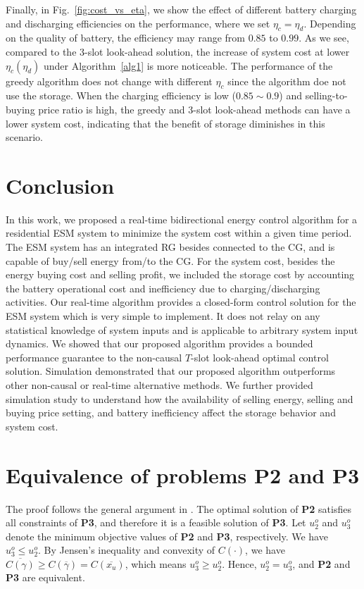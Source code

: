 \documentclass[journal]{IEEEtran}
\begin{document}
Finally, in Fig.~\ref{fig:cost_vs_eta}, we show the effect of different battery charging and discharging efficiencies on the performance, where we set $\eta_c=\eta_d$. Depending on the quality of battery, the efficiency may range from $0.85$ to $0.99$. As we see, compared to the 3-slot look-ahead solution, the increase of system cost  at lower $\eta_c(\eta_d)$ under Algorithm~\ref{alg1} is more noticeable. The performance of the greedy algorithm does not change with different $\eta_c$ since the algorithm doe not use the storage. When the charging efficiency is low ($0.85\sim0.9$) and  selling-to-buying price ratio is high, the greedy and 3-slot look-ahead methods can have a lower system cost, indicating that the benefit of storage diminishes in this scenario.


\section{Conclusion}\label{sec:conclusion}
In this work, we proposed a real-time bidirectional energy control algorithm for a residential ESM system to minimize the system cost within  a given time period. The ESM system has an integrated RG besides connected to the CG, and is capable of buy/sell energy from/to the CG. For the system cost, besides the energy buying cost and selling profit, we included the storage cost by accounting the battery operational cost and inefficiency due to charging/discharging activities. Our real-time algorithm provides a closed-form control solution for the ESM system which is very simple to implement. It does not relay on any statistical knowledge of system inputs and is applicable to arbitrary system input dynamics. We showed that our proposed algorithm provides a bounded performance guarantee to the non-causal $T$-slot look-ahead optimal control solution. Simulation demonstrated that our proposed algorithm outperforms other non-causal or real-time alternative methods. We further provided simulation study to understand how the availability of selling energy, selling and buying price setting, and battery inefficiency affect the storage behavior and system cost.


\appendices
\section{Equivalence of problems {\bf P2} and {\bf P3}}\label{appA}

The proof follows the general argument in \cite{Neely:ArXiv2010}.
The optimal solution of \textrm{\bf P2} satisfies all constraints of \textrm{\bf P3}, and therefore it is a feasible solution of {\bf P3}. Let $u^o_2$ and $u^o_3$ denote the minimum objective values of {\bf P2} and {\bf P3}, respectively. We have $u^o_3\le u^o_2$. By Jensen's inequality and convexity of $C(\cdot)$, we have
$\overline{C(\gamma)}\geq C(\overline{\gamma})=C(\overline{x_u})$, which means $u^o_3\ge u^o_2$. Hence,  $u^o_2=u^o_3$, and \textrm{\bf P2} and \textrm{\bf P3} are equivalent.
\end{document}
